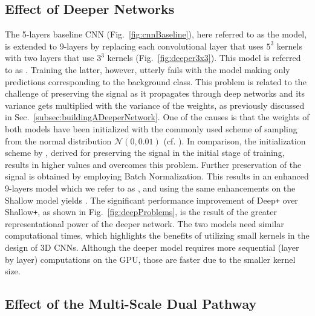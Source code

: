\subsection{Effect of Deeper Networks}
\label{subsec:valDeeper}



The 5-layers baseline CNN (Fig.~\ref{fig:cnnBaseline}), here referred to as the  model, is extended to 9-layers by replacing each convolutional layer that uses $5^3$ kernels with two layers that use $3^3$ kernels (Fig.~\ref{fig:deeper3x3}). This model is referred to as . Training the latter, however, utterly fails with the model making only predictions corresponding to the background class. This problem is related to the challenge of preserving the signal as it propagates through deep networks and its variance gets multiplied with the variance of the weights, as previously discussed in Sec.~\ref{subsec:buildingADeeperNetwork}. One of the causes is that the weights of both models have been initialized with the commonly used scheme of sampling from the normal distribution $\mathcal{N}(0,0.01)$ (cf. \cite{Krizhevsky2012}). In comparison, the initialization scheme by \cite{he2015delving}, derived for preserving the signal in the initial stage of training, results in higher values and overcomes this problem. Further preservation of the signal is obtained by employing Batch Normalization. This results in an enhanced 9-layers model which we refer to as , and using the same enhancements on the Shallow model yields . The significant performance improvement of Deep\texttt{+} over Shallow\texttt{+}, as shown in Fig.~\ref{fig:deepProblems}, is the result of the greater representational power of the deeper network. The two models need similar computational times, which highlights the benefits of utilizing small kernels in the design of 3D CNNs. Although the deeper model requires more sequential (layer by layer) computations on the GPU, those are faster due to the smaller kernel size.

\subsection{Effect of the Multi-Scale Dual Pathway}
\label{subsec:valMultiscale}



